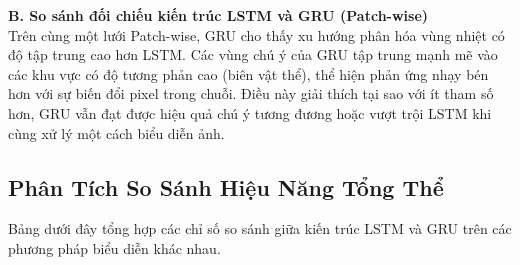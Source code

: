 \documentclass[12pt,a4paper]{article}
\numberwithin{figure}{section}
\numberwithin{table}{section}
\begin{document}
\textbf{B. So sánh đối chiếu kiến trúc LSTM và GRU (Patch-wise)} \\
Trên cùng một lưới Patch-wise, GRU cho thấy xu hướng phân hóa vùng nhiệt có độ tập trung cao hơn LSTM. Các vùng chú ý của GRU tập trung mạnh mẽ vào các khu vực có độ tương phản cao (biên vật thể), thể hiện phản ứng nhạy bén hơn với sự biến đổi pixel trong chuỗi. Điều này giải thích tại sao với ít tham số hơn, GRU vẫn đạt được hiệu quả chú ý tương đương hoặc vượt trội LSTM khi cùng xử lý một cách biểu diễn ảnh.

\subsection{Phân Tích So Sánh Hiệu Năng Tổng Thể}
Bảng dưới đây tổng hợp các chỉ số so sánh giữa kiến trúc LSTM và GRU trên các phương pháp biểu diễn khác nhau.

\begin{table}[H]
    \centering
    \caption{Bảng so sánh chỉ số giữa các phương pháp biểu diễn và kiến trúc RNN trên tập CIFAR-10.}
\end{table}
\end{document}
